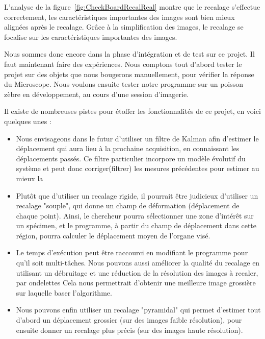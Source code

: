 L'analyse de la figure~\ref{fig:CheckBoardRecalReal} montre que le recalage s'effectue correctement,
les caractéristiques importantes des images sont bien mieux alignées après le recalage.
Grâce à la simplification des images, le recalage se focalise sur les caractéristiques importantes des images.





Nous sommes donc encore dans la phase d'intégration et de test sur ce projet.
Il faut maintenant faire des expériences. Nous comptons tout d'abord tester le projet
sur des objets que nous bougerons manuellement, pour vérifier la réponse du Microscope.
Nous voulons ensuite tester notre programme sur un poisson zèbre en développement, au cours d'une session d'imagerie.

Il existe de nombreuses pistes pour étoffer les fonctionnalités de ce projet, en voici quelques unes :\begin{itemize}
  \item Nous envisageons dans le futur d'utiliser un filtre de Kalman afin d'estimer
  le déplacement qui aura lieu à la prochaine acquisition, en connaissant les déplacements passés. Ce filtre particulier incorpore un modèle évolutif du système et peut donc corriger(filtrer) les mesures précédentes pour estimer au mieux la 
  \item Plutôt que d'utiliser un recalage rigide, il pourrait être judicieux d'utiliser un recalage "souple",
  qui donne un champ de déformation (déplacement de chaque point).
  Ainsi, le chercheur pourra sélectionner une zone d'intérêt sur un spécimen,
  et le programme, à partir du champ de déplacement dans cette région, pourra calculer
  le déplacement moyen de l'organe visé.
  \item Le temps d'exécution peut être raccourci en modifiant le programme pour qu'il soit multi-tâches.
  Nous pouvons aussi améliorer la qualité du recalage en utilisant un débruitage et une réduction de la résolution
  des images à recaler, par ondelettes
  Cela nous permettrait d'obtenir une meilleure image grossière sur laquelle baser l'algorithme.
  \item Nous pouvons enfin utiliser un recalage "pyramidal" qui permet d'estimer tout d'abord un déplacement
  grossier (sur des images faible résolution), pour ensuite donner un recalage plus précis (sur des images haute résolution).
\end{itemize}




\clearpage

